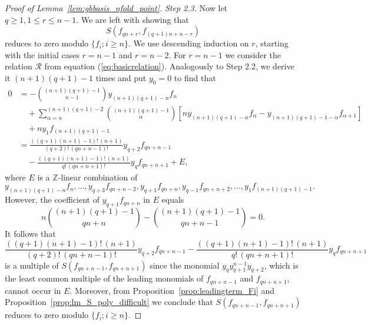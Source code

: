 \begin{proof}[Proof of Lemma~\ref{lem:gbbasis_nfold_point}]
\textit{Step 2.3.} Now let $q\geq 1, 1\leq r \leq n-1$. We are left with showing that 
\[S(f_{qn+r},f_{(q+1)n + n-r})\] 
reduces to zero modulo $\{f_i ; i\geq n\}$. We use descending induction on $r$, starting with the initial cases $r=n-1$ and $r=n-2$. For $r=n-1$ we consider the relation $\mathcal{R}$ from equation (\ref{eq:basicrelation}). Analogously to Step 2.2, we derive it $(n+1)(q+1) - 1$ times and put $y_0=0$ to find that
\begin{align*}
  0 & = - \binom{(n+1)(q+1) - 1}{n-1} y_{(n+1)(q+1) - n } f_{n}  \\
  & \quad +  \sum_{\alpha = n}^{(n+1)(q+1) - 2} \binom{(n+1)(q+1) - 1}{\alpha} \left[n y_{(n+1)(q+1) - \alpha } f_{\alpha} -  y_{(n+1)(q+1) - 1 - \alpha} f_{\alpha+1} \right]\\
  & \quad + n y_{1} f_{(n+1)(q+1) - 1} \\
    & = \frac{((q+1)(n+1)-1)!\, (n+1)}{(q+2)!\, (qn+n-1)!} y_{q+2}f_{qn+n-1}\\
    & \quad - \frac{((q+1)(n+1)-1)!\, (n+1)}{q!\, (qn+n+1)!} y_{q}f_{qn+n+1} + E,
\end{align*} 
where $E$ is a $\mathbb{Z}$-linear combination of 
\[  y_{(n+1)(q+1) - n } f_{n} , \ldots, y_{q+3}f_{qn+n-2} , y_{q+1} f_{qn+n} , y_{q-1}f_{qn+n+2} , \ldots , y_{1} f_{(n+1)(q+1) - 1}.        \]
However, the coefficient of $y_{q+1} f_{qn+n}$ in $E$ equals
\[   n \binom{(n+1)(q+1) - 1}{qn+n} - \binom{(n+1)(q+1) - 1}{qn+n-1}  = 0.  \]
It follows that
\[ \frac{((q+1)(n+1)-1)!\, (n+1)}{(q+2)!\, (qn+n-1)!} y_{q+2}f_{qn+n-1} - \frac{((q+1)(n+1)-1)!\, (n+1)}{q!\, (qn+n+1)!} y_{q}f_{qn+n+1} \]
is a multiple of $S(f_{qn+n-1},f_{qn + n + 1})$ since the monomial $y_{q}y_{q+1}^{n-1}y_{q+2}$, which is the least common multiple of the leading monomials of $f_{qn+n-1}$ and $f_{qn + n + 1}$, cannot occur in $E$. Moreover, from Proposition~\ref{prop:leadingterm_Fi} and Proposition~\ref{prop:lm_S_poly_difficult} we conclude that $S(f_{qn+n-1},f_{qn + n + 1})$ reduces to zero modulo $\{f_i; i\geq n\}$. 

\vspace{1mm}


\end{proof}
